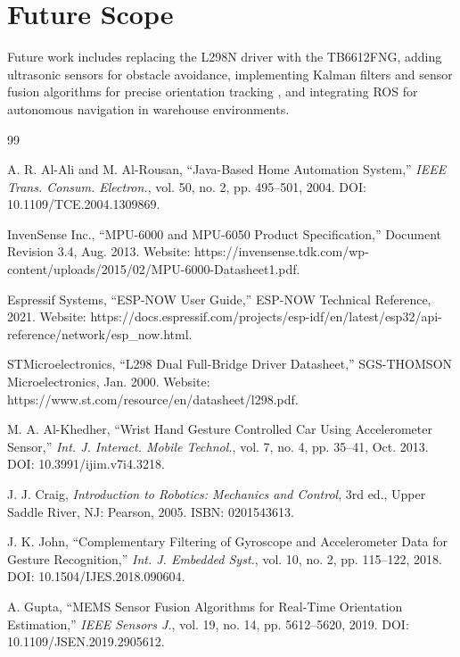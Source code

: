 \documentclass[12pt,a4paper,oneside]{report}
\begin{document}
\section{Future Scope}
Future work includes replacing the L298N driver with the TB6612FNG, adding ultrasonic sensors for obstacle avoidance, implementing Kalman filters and sensor fusion algorithms for precise orientation tracking \cite{fusion_ref}, and integrating ROS for autonomous navigation in warehouse environments.

\clearpage
\begin{singlespace}
\begin{thebibliography}{99}
\fontsize{10}{12}\selectfont
\setlength{\itemsep}{4pt}
\setlength{\parsep}{0pt}

A. R. Al-Ali and M. Al-Rousan, ``Java-Based Home Automation System,'' \textit{IEEE Trans. Consum. Electron.}, vol. 50, no. 2, pp. 495--501, 2004. DOI: 10.1109/TCE.2004.1309869.

InvenSense Inc., ``MPU-6000 and MPU-6050 Product Specification,'' Document Revision 3.4, Aug. 2013. Website: https://invensense.tdk.com/wp-content/uploads/2015/02/MPU-6000-Datasheet1.pdf.

Espressif Systems, ``ESP-NOW User Guide,'' ESP-NOW Technical Reference, 2021. Website: https://docs.espressif.com/projects/esp-idf/en/latest/esp32/api-reference/network/esp\_now.html.

STMicroelectronics, ``L298 Dual Full-Bridge Driver Datasheet,'' SGS-THOMSON Microelectronics, Jan. 2000. Website: https://www.st.com/resource/en/datasheet/l298.pdf.

M. A. Al-Khedher, ``Wrist Hand Gesture Controlled Car Using Accelerometer Sensor,'' \textit{Int. J. Interact. Mobile Technol.}, vol. 7, no. 4, pp. 35--41, Oct. 2013. DOI: 10.3991/ijim.v7i4.3218.

J. J. Craig, \textit{Introduction to Robotics: Mechanics and Control}, 3rd ed., Upper Saddle River, NJ: Pearson, 2005. ISBN: 0201543613.

J. K. John, ``Complementary Filtering of Gyroscope and Accelerometer Data for Gesture Recognition,'' \textit{Int. J. Embedded Syst.}, vol. 10, no. 2, pp. 115--122, 2018. DOI: 10.1504/IJES.2018.090604.

A. Gupta, ``MEMS Sensor Fusion Algorithms for Real-Time Orientation Estimation,'' \textit{IEEE Sensors J.}, vol. 19, no. 14, pp. 5612--5620, 2019. DOI: 10.1109/JSEN.2019.2905612.

\end{thebibliography}
\end{singlespace}
\end{document}
